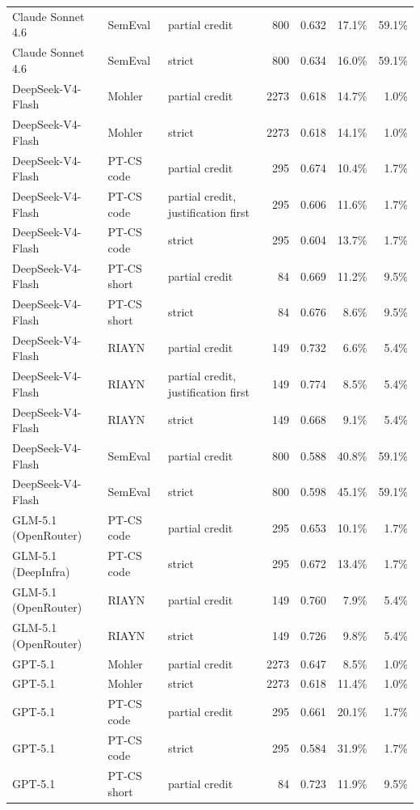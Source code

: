 \documentclass[10pt]{article}
\begin{document}
\begin{longtable}{ll>{\raggedright\arraybackslash}p{3.2cm}rrrr}
Claude Sonnet 4.6 & SemEval & partial credit & 800 & 0.632 & 17.1\% & 59.1\% \\
Claude Sonnet 4.6 & SemEval & strict & 800 & 0.634 & 16.0\% & 59.1\% \\
DeepSeek-V4-Flash & Mohler & partial credit & 2273 & 0.618 & 14.7\% & 1.0\% \\
DeepSeek-V4-Flash & Mohler & strict & 2273 & 0.618 & 14.1\% & 1.0\% \\
DeepSeek-V4-Flash & PT-CS code & partial credit & 295 & 0.674 & 10.4\% & 1.7\% \\
DeepSeek-V4-Flash & PT-CS code & partial credit, justification first & 295 & 0.606 & 11.6\% & 1.7\% \\
DeepSeek-V4-Flash & PT-CS code & strict & 295 & 0.604 & 13.7\% & 1.7\% \\
DeepSeek-V4-Flash & PT-CS short & partial credit & 84 & 0.669 & 11.2\% & 9.5\% \\
DeepSeek-V4-Flash & PT-CS short & strict & 84 & 0.676 & 8.6\% & 9.5\% \\
DeepSeek-V4-Flash & RIAYN & partial credit & 149 & 0.732 & 6.6\% & 5.4\% \\
DeepSeek-V4-Flash & RIAYN & partial credit, justification first & 149 & 0.774 & 8.5\% & 5.4\% \\
DeepSeek-V4-Flash & RIAYN & strict & 149 & 0.668 & 9.1\% & 5.4\% \\
DeepSeek-V4-Flash & SemEval & partial credit & 800 & 0.588 & 40.8\% & 59.1\% \\
DeepSeek-V4-Flash & SemEval & strict & 800 & 0.598 & 45.1\% & 59.1\% \\
GLM-5.1 (OpenRouter) & PT-CS code & partial credit & 295 & 0.653 & 10.1\% & 1.7\% \\
GLM-5.1 (DeepInfra) & PT-CS code & strict & 295 & 0.672 & 13.4\% & 1.7\% \\
GLM-5.1 (OpenRouter) & RIAYN & partial credit & 149 & 0.760 & 7.9\% & 5.4\% \\
GLM-5.1 (OpenRouter) & RIAYN & strict & 149 & 0.726 & 9.8\% & 5.4\% \\
GPT-5.1 & Mohler & partial credit & 2273 & 0.647 & 8.5\% & 1.0\% \\
GPT-5.1 & Mohler & strict & 2273 & 0.618 & 11.4\% & 1.0\% \\
GPT-5.1 & PT-CS code & partial credit & 295 & 0.661 & 20.1\% & 1.7\% \\
GPT-5.1 & PT-CS code & strict & 295 & 0.584 & 31.9\% & 1.7\% \\
GPT-5.1 & PT-CS short & partial credit & 84 & 0.723 & 11.9\% & 9.5\% \\

\end{longtable}
\end{document}
